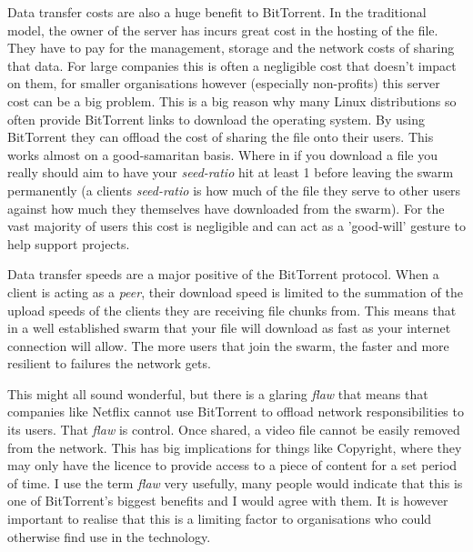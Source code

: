 \documentclass{l4proj}
\begin{document}
Data transfer costs are also a huge benefit to BitTorrent. In the traditional model, the owner of the server has incurs great cost in the hosting of the file. They have to pay for the management, storage and the network costs of sharing that data. For large companies this is often a negligible cost that doesn't impact on them, for smaller organisations however (especially non-profits) this server cost can be a big problem. This is a big reason why many Linux distributions so often provide BitTorrent links to download the operating system. By using BitTorrent they can offload the cost of sharing the file onto their users. This works almost on a good-samaritan basis. Where in if you download a file you really should aim to have your \textit{seed-ratio} hit at least 1 before leaving the swarm permanently (a clients \textit{seed-ratio} is how much of the file they serve to other users against how much they themselves have downloaded from the swarm). For the vast majority of users this cost is negligible and can act as a 'good-will' gesture to help support projects.

Data transfer speeds are a major positive of the BitTorrent protocol. When a client is acting as a \textit{peer}, their download speed is limited to the summation of the upload speeds of the clients they are receiving file chunks from. This means that in a well established swarm that your file will download as fast as your internet connection will allow. The more users that join the swarm, the faster and more resilient to failures the network gets.

This might all sound wonderful, but there is a glaring \textit{flaw} that means that companies like Netflix cannot use BitTorrent to offload network responsibilities to its users. That \textit{flaw} is control. Once shared, a video file cannot be easily removed from the network. This has big implications for things like Copyright, where they may only have the licence to provide access to a piece of content for a set period of time. I use the term \textit{flaw} very usefully, many people would indicate that this is one of BitTorrent's biggest benefits and I would agree with them. It is however important to realise that this is a limiting factor to organisations who could otherwise find use in the technology.
\end{document}
